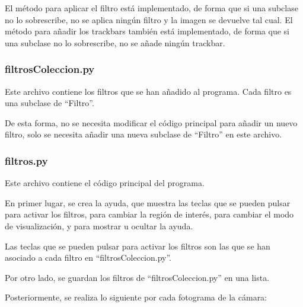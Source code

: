 \documentclass[12pt]{article}
\begin{document}
El método para aplicar el filtro está implementado, de forma que si una subclase no lo sobrescribe, no se aplica ningún filtro y la imagen se devuelve tal cual. El método para añadir los trackbars también está implementado, de forma que si una subclase no lo sobrescribe, no se añade ningún trackbar.

\subsubsection*{filtrosColeccion.py}
Este archivo contiene los filtros que se han añadido al programa. Cada filtro es una subclase de ``Filtro''.

De esta forma, no se necesita modificar el código principal para añadir un nuevo filtro, solo se necesita añadir una nueva subclase de ``Filtro'' en este archivo.

\subsubsection*{filtros.py}
Este archivo contiene el código principal del programa.

En primer lugar, se crea la ayuda, que muestra las teclas que se pueden pulsar para activar los filtros, para cambiar la región de interés, para cambiar el modo de visualización, y para mostrar u ocultar la ayuda.

Las teclas que se pueden pulsar para activar los filtros son las que se han asociado a cada filtro en ``filtrosColeccion.py''. 

Por otro lado, se guardan los filtros de ``filtrosColeccion.py'' en una lista.

Posteriormente, se realiza lo siguiente por cada fotograma de la cámara:
\end{document}
